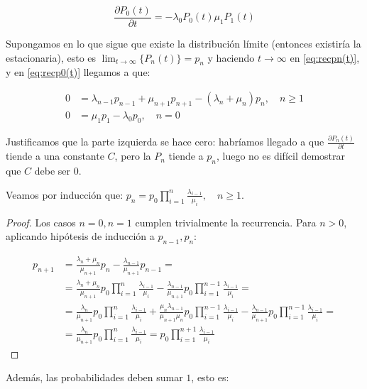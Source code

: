 \documentclass[a4paper,10pt]{scrartcl}
\theoremstyle{definition}
\numberwithin{equation}{section}
\begin{document}
	\begin{equation}
	\frac{\partial P_0(t)}{\partial t} = -\lambda_0 P_0(t) \mu_{1}P_{1}(t)
	\label{eq:recp0(t)}
	\end{equation}
	
	
	Supongamos en lo que sigue que existe la distribución límite (entonces existiría la estacionaria), esto es 
	$\lim_{t\rightarrow \infty}\{P_n(t)\} = p_n$ y haciendo $t\rightarrow \infty$ en \eqref{eq:recpn(t)},
	y en \eqref{eq:recp0(t)} llegamos a que:
	
	\begin{align*}
	0 &= \lambda_{n-1} p_{n-1} + \mu_{n+1} p_{n+1} - (\lambda_n + \mu_n) p_n, \quad n\ge 1\\
	0 &= \mu_1 p_1 -\lambda_0 p_0, \quad n=0
	\end{align*}
	
	Justificamos que la parte izquierda se hace cero: habríamos llegado a que $\frac{\partial P_n(t)}{\partial t}$ tiende a una constante $C$,
	pero la $P_n$ tiende a $p_n$, luego no es difícil demostrar que $C$ debe ser 0.
	
	Veamos por inducción que: $p_n = p_0 \prod_{i=1}^n \frac{\lambda_{i-1}}{\mu_i}, \quad n\ge 1 \label{p_n=p_0*}$.
	
	\begin{proof}
		Los casos $n=0, n=1$ cumplen trivialmente la recurrencia. Para $n>0$, aplicando hipótesis de inducción a $p_{n-1}, p_{n}$:
		
		\begin{align*}
		p_{n+1} &= \frac{\lambda_n + \mu_n}{\mu_{n+1}} p_n - \frac{\lambda_{n-1}}{\mu_{n+1}}p_{n-1} = \\
		&= \frac{\lambda_n + \mu_n}{\mu_{n+1}} p_0 \prod_{i=1}^n \frac{\lambda_{i-1}}{\mu_i} - 
		\frac{\lambda_{n-1}}{\mu_{n+1}} p_0 \prod_{i=1}^{n-1} \frac{\lambda_{i-1}}{\mu_i} = \\
		&= \frac{\lambda_n}{\mu_{n+1}} p_0 \prod_{i=1}^n \frac{\lambda_{i-1}}{\mu_i} + 
		\frac{\mu_n \lambda_{n-1}}{\mu_{n+1}\mu_n} p_0 \prod_{i=1}^{n-1} \frac{\lambda_{i-1}}{\mu_i} - 
		\frac{\lambda_{n-1}}{\mu_{n+1}} p_0 \prod_{i=1}^{n-1} \frac{\lambda_{i-1}}{\mu_i} = \\
		&= \frac{\lambda_n}{\mu_{n+1}} p_0 \prod_{i=1}^n \frac{\lambda_{i-1}}{\mu_i} = p_0 \prod_{i=1}^{n+1} \frac{\lambda_{i-1}}{\mu_i}
		\end{align*}
	\end{proof}
	
	Además, las probabilidades deben sumar $1$, esto es:
	
\end{document}
